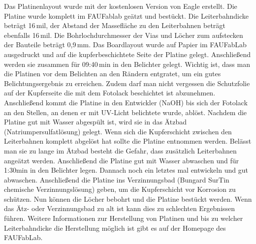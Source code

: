 Das Platinenlayout wurde mit der kostenlosen Version von Eagle erstellt. Die Platine wurde komplett im FAUFablab geätzt und bestückt. Die Leiterbahndicke beträgt 16\,mil, der Abstand der Massefläche zu den Leiterbahnen beträgt ebenfalls 16\,mil. Die Bohrlochdurchmesser der Vias und Löcher zum aufstecken der Bauteile beträgt 0,9\,mm. Das Boardlayout wurde auf Papier im FAUFabLab ausgedruckt und auf die kupferbeschichtete Seite der Platine gelegt. Anschließend werden sie zusammen für 09:40\,min in den Belichter gelegt.  Wichtig ist, dass man die Platinen vor dem Belichten an den Rändern entgratet, um ein gutes Belichtungsergebnis zu erreichen. Zudem darf man nicht vergessen die Schutzfolie auf der Kupferseite die mit dem Fotolack beschichtet ist abzunehmen. Anschließend kommt die Platine in den Entwickler (NaOH) bis sich der Fotolack an den Stellen, an denen er mit UV-Licht belichtete wurde, ablöst. Nachdem die Platine gut mit Wasser abgespült ist, wird sie in das Ätzbad (Natriumpersulfatlösung) gelegt. Wenn sich die Kupferschicht zwischen den Leiterbahnen komplett abgelöst hat sollte die Platine entnommen werden. Belässt man sie zu lange im Ätzbad besteht die Gefahr, dass zusätzlich Leiterbahnen angeätzt werden. Anschließend die Platine gut mit Wasser abwaschen und für 1:30min in den Belichter legen. Dannach noch ein letztes mal entwickeln und gut abwaschen. Anschließend die Platine ins Verzinnungsbad (Bungard SurTin chemische Verzinnungslösung) geben, um die Kupferschicht vor Korrosion zu schützen. Nun können die Löcher bebohrt und die Platine bestückt werden.
Wenn das Ätz- oder Verzinnungsbad zu alt ist kann dies zu schlechten Ergebnissen führen.
Weitere Informationen zur Herstellung von Platinen und bis zu welcher Leiterbahndicke die Herstellung möglich ist gibt es auf der Homepage des FAUFabLab.